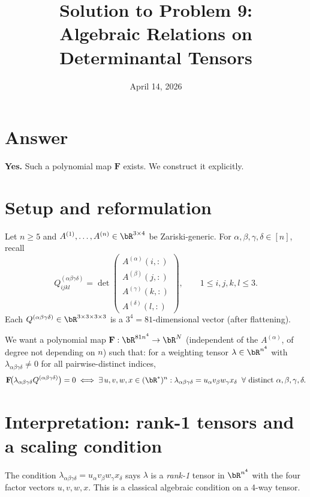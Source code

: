 \documentclass[12pt]{article}
\title{Solution to Problem 9:\\Algebraic Relations on Determinantal Tensors}
\author{}
\date{April 14, 2026}
\begin{document}
\maketitle

\section*{Answer}

\textbf{Yes.} Such a polynomial map $\mathbf{F}$ exists.  We construct it explicitly.

\section*{Setup and reformulation}

Let $n\geq 5$ and $A^{(1)},\ldots,A^{(n)}\in\bR^{3\times 4}$ be Zariski-generic.  For $\alpha,\beta,\gamma,\delta\in[n]$, recall
\[
  Q^{(\alpha\beta\gamma\delta)}_{ijkl} = \det\begin{pmatrix}
    A^{(\alpha)}(i,:) \\ A^{(\beta)}(j,:) \\ A^{(\gamma)}(k,:) \\ A^{(\delta)}(l,:)
  \end{pmatrix}, \qquad 1\leq i,j,k,l\leq 3.
\]
Each $Q^{(\alpha\beta\gamma\delta)}\in\bR^{3\times 3\times 3\times 3}$ is a $3^4=81$-dimensional vector (after flattening).

We want a polynomial map $\mathbf{F}:\bR^{81 n^4}\to\bR^N$ (independent of the $A^{(\alpha)}$, of degree not depending on $n$) such that: for a weighting tensor $\lambda\in\bR^{n^4}$ with $\lambda_{\alpha\beta\gamma\delta}\neq 0$ for all pairwise-distinct indices,
\[
  \mathbf{F}\!\bigl(\lambda_{\alpha\beta\gamma\delta} Q^{(\alpha\beta\gamma\delta)}\bigr) = 0
  \iff
  \exists\, u,v,w,x\in(\bR^*)^n : \lambda_{\alpha\beta\gamma\delta} = u_\alpha v_\beta w_\gamma x_\delta\;\;\forall\text{ distinct }\alpha,\beta,\gamma,\delta.
\]

\section*{Interpretation: rank-1 tensors and a scaling condition}

The condition $\lambda_{\alpha\beta\gamma\delta} = u_\alpha v_\beta w_\gamma x_\delta$ says $\lambda$ is a \emph{rank-1} tensor in $\bR^{n^4}$ with the four factor vectors $u,v,w,x$.  This is a classical algebraic condition on a 4-way tensor.
\end{document}
